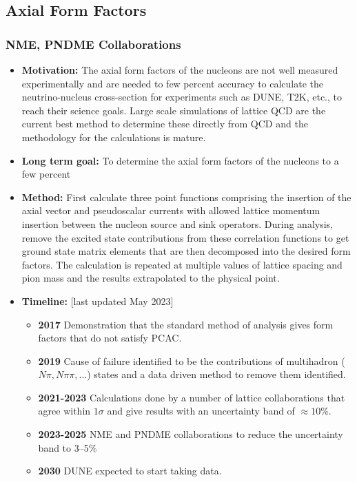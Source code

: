 \documentclass[12pt,hyperpdf]{article}
\begin{document}
\subsection{Axial Form Factors}\label{sec:axff}

\subsubsection{NME, PNDME Collaborations}
\begin{itemize}
    \item{\bf Motivation:} The axial form factors of the nucleons are not well measured experimentally and are
      needed to few percent accuracy to calculate the neutrino-nucleus cross-section for experiments such as DUNE, T2K, etc., to 
      reach their science goals. Large scale simulations of lattice QCD are the current 
      best method to determine these directly from QCD and the methodology for the 
      calculations is mature. 
    \item{\bf Long term goal:} To determine the axial form factors of the nucleons to a few percent 
    \item{\bf Method:} First calculate three point functions comprising the insertion of the axial vector and pseudoscalar currents 
      with allowed lattice  momentum insertion between the nucleon source and sink operators. During analysis, remove 
      the excited state contributions from these correlation functions to get ground state matrix elements that are 
      then decomposed into the desired form factors. The calculation is repeated at multiple values of lattice spacing and 
      pion mass and the results extrapolated to the physical point. 
\item{\bf Timeline:} \hfill [last updated May 2023]
\begin{itemize}
    \item{\bf 2017} Demonstration that the standard method of analysis gives form factors that do not satisfy PCAC.
    \item{\bf 2019} Cause of failure identified to be the contributions of multihadron ($N\pi, N\pi\pi, \ldots$) states 
      and a data driven method to remove them identified.
    \item{\bf 2021-2023} Calculations done by a number of lattice collaborations that agree within $1\sigma$ and give results
      with an uncertainty band of $\approx 10\%$.
    \item{\bf 2023-2025} NME and PNDME collaborations to reduce the uncertainty band to 3--5\%
    \item{\bf 2030} DUNE expected to start taking data.
\end{itemize}
\end{itemize}
\end{document}
